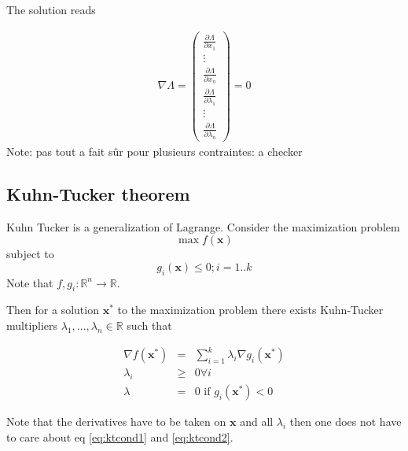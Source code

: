The solution reads

\begin{eqnarray}
	\nabla \Lambda 
	=
	\begin{pmatrix}
		\frac{\partial \Lambda}{\partial x_1}\\
		\vdots\\
		\frac{\partial \Lambda}{\partial x_n}\\
		\frac{\partial \Lambda }{\partial \lambda_1}\\
		\vdots\\
		\frac{\partial \Lambda }{\partial \lambda_n}
	\end{pmatrix}
	=0
\end{eqnarray}
Note: pas tout a fait sûr pour plusieurs contraintes: a checker


\subsection{Kuhn-Tucker theorem}
Kuhn Tucker is a generalization of Lagrange.
Consider the maximization problem
\begin{equation}
	\max f( \mathbf{x})
\end{equation}
subject to
\begin{equation}
	g_i( \mathbf{x})\leq 0; i=1.. k
\end{equation}
Note that $f, g_i: \mathbb R^n\rightarrow \mathbb R$.

Then for a solution $\mathbf{x^*}$ to the maximization problem there exists Kuhn-Tucker multipliers $\lambda_1,...,\lambda_n\in\mathbb R$ such that

\begin{eqnarray}
	\nabla f( \mathbf{x^*})&=& \sum_{i=1}^k \lambda_i\nabla g_i( \mathbf{x^*})\\
	\label{eq:ktcond1}
	\lambda_i&\geq&0 \forall i\\
	\label{eq:ktcond2}
	\lambda &=& 0 \text{ if } g_i( \mathbf{x^*})<0
\end{eqnarray}

Note that the derivatives have to be taken on $\mathbf{x}$ and all $\lambda_i$ then one does not have to care about eq \ref{eq:ktcond1} and \ref{eq:ktcond2}.

